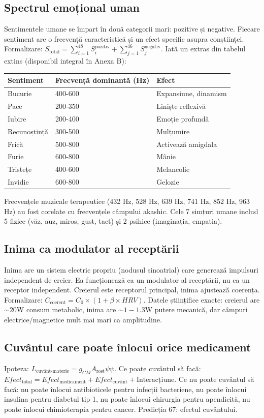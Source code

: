 \documentclass[11pt,a4paper]{article}
\begin{document}
\subsection{Spectrul emoțional uman}
Sentimentele umane se împart în două categorii mari: pozitive și negative. Fiecare sentiment are o frecvență caracteristică și un efect specific asupra conștiinței. Formalizare: $S_{\text{total}} = \sum_{i=1}^{48} S_i^{\text{pozitiv}} + \sum_{j=1}^{46} S_j^{\text{negativ}}$. Iată un extras din tabelul extins (disponibil integral în Anexa B):
\begin{table}[H]
\centering
\begin{tabular}{@{}lll@{}}
\toprule
\textbf{Sentiment} & \textbf{Frecvență dominantă (Hz)} & \textbf{Efect} \\ \midrule
Bucurie & 400-600 & Expansiune, dinamism \\
Pace & 200-350 & Liniște reflexivă \\
Iubire & 200-400 & Emoție profundă \\
Recunoștință & 300-500 & Mulțumire \\
Frică & 500-800 & Activează amigdala \\
Furie & 600-800 & Mânie \\
Tristețe & 400-600 & Melancolie \\
Invidie & 600-800 & Gelozie \\ \bottomrule
\end{tabular}
\end{table}
Frecvențele muzicale terapeutice (432 Hz, 528 Hz, 639 Hz, 741 Hz, 852 Hz, 963 Hz) au fost corelate cu frecvențele câmpului akashic. Cele 7 simțuri umane includ 5 fizice (văz, auz, miros, gust, tact) și 2 psihice (imaginația, empatia).

\subsection{Inima ca modulator al receptării}
Inima are un sistem electric propriu (nodusul sinoatrial) care generează impulsuri independent de creier. Ea funcționează ca un modulator al receptării, nu ca un receptor independent. Creierul este receptorul principal, inima ajustează coerența. Formalizare: $C_{\text{coerent}} = C_0 \times (1 + \beta \times HRV)$. Datele științifice exacte: creierul are $\sim 20$W consum metabolic, inima are $\sim 1-1.3$W putere mecanică, dar câmpuri electrice/magnetice mult mai mari ca amplitudine.

\subsection{Cuvântul care poate înlocui orice medicament}
Ipoteza: $L_{\text{cuvânt-materie}} = g_{CM} A_{\text{rost}} \psi \psi$. Ce poate cuvântul să facă: $Efect_{\text{total}} = Efect_{\text{medicament}} + Efect_{\text{cuvânt}} + \text{Interacțiune}$. Ce nu poate cuvântul să facă: nu poate înlocui antibioticele pentru infecții bacteriene, nu poate înlocui insulina pentru diabetul tip 1, nu poate înlocui chirurgia pentru apendicită, nu poate înlocui chimioterapia pentru cancer. Predicția 67: efectul cuvântului.
\end{document}
